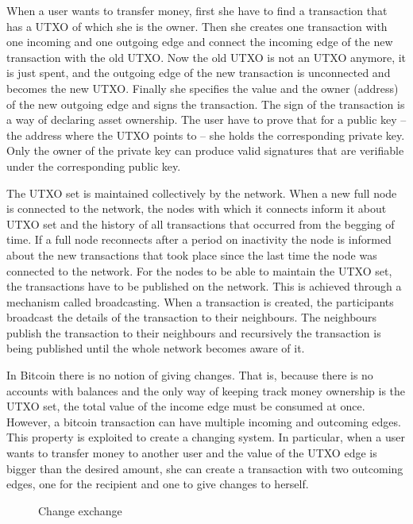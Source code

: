 When a user wants to transfer money, first she have to find a transaction that has a UTXO of which she is the owner. Then she creates one transaction with one incoming and one outgoing edge and connect the incoming edge of the new transaction with the old UTXO. Now the old UTXO is not an UTXO anymore, it is just spent, and the outgoing edge of the new transaction is unconnected and becomes the new UTXO. Finally she specifies the value and the owner (address) of the new outgoing edge and signs the transaction. The sign of the transaction is a way of declaring asset ownership. The user have to prove that for a public key -- the address where the UTXO points to -- she holds the corresponding private key. Only the owner of the private key can produce valid signatures that are verifiable under the corresponding public key.

The UTXO set is maintained collectively by the network. When a new full node is connected to the network, the nodes with which it connects inform it about UTXO set and the history of all transactions that occurred from the begging of time. If a full node reconnects after a period on inactivity the node is informed about the new transactions that took place since the last time the node was connected to the network. For the nodes to be able to maintain the UTXO set, the transactions have to be published on the network. This is achieved through a mechanism called broadcasting. When a transaction is created, the participants broadcast the details of the transaction to their neighbours. The neighbours publish the transaction to their neighbours and recursively the transaction is being published until the whole network becomes aware of it.

In Bitcoin there is no notion of giving changes. That is, because there is no accounts with balances and the only way of keeping track money ownership is the UTXO set, the total value of the income edge must be consumed at once. However, a bitcoin transaction can have multiple incoming and outcoming edges. This property is exploited to create a changing system. In particular, when a user wants to transfer money to another user and the value of the UTXO edge is bigger than the desired amount, she can create a transaction with two outcoming edges, one for the recipient and one to give changes to herself.

\begin{figure}[!ht]
  \centering
  \caption{Change exchange}
  \label{fig:bl_tx:change}
\end{figure}


